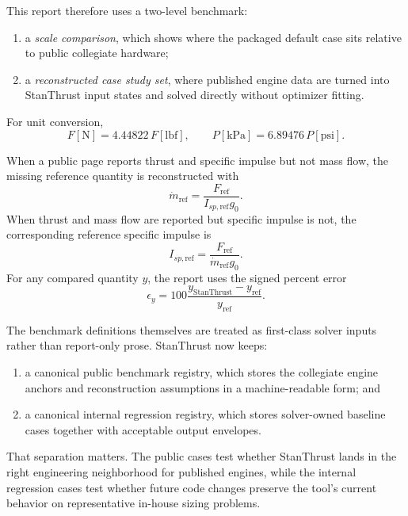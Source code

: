 \documentclass[11pt]{article}
\begin{document}
This report therefore uses a two-level benchmark:
\begin{enumerate}[leftmargin=6mm]
\item a \emph{scale comparison}, which shows where the packaged default case sits relative to public collegiate hardware;
\item a \emph{reconstructed case study set}, where published engine data are turned into StanThrust input states and solved directly without optimizer fitting.
\end{enumerate}

For unit conversion,
\begin{equation}
F[\mathrm{N}] = 4.44822\,F[\mathrm{lbf}],
\qquad
P[\mathrm{kPa}] = 6.89476\,P[\mathrm{psi}].
\label{eq:unit-conv}
\end{equation}

When a public page reports thrust and specific impulse but not mass flow, the missing reference quantity is reconstructed with
\begin{equation}
\dot{m}_{\mathrm{ref}} = \frac{F_{\mathrm{ref}}}{I_{sp,\mathrm{ref}} g_0}.
\label{eq:benchmark-mdot}
\end{equation}
When thrust and mass flow are reported but specific impulse is not, the corresponding reference specific impulse is
\begin{equation}
I_{sp,\mathrm{ref}} = \frac{F_{\mathrm{ref}}}{\dot{m}_{\mathrm{ref}} g_0}.
\label{eq:benchmark-isp}
\end{equation}
For any compared quantity $y$, the report uses the signed percent error
\begin{equation}
\epsilon_y = 100\frac{y_{\mathrm{StanThrust}} - y_{\mathrm{ref}}}{y_{\mathrm{ref}}}.
\label{eq:benchmark-error}
\end{equation}

The benchmark definitions themselves are treated as first-class solver inputs rather than report-only prose. StanThrust now keeps:
\begin{enumerate}[leftmargin=6mm]
\item a canonical public benchmark registry, which stores the collegiate engine anchors and reconstruction assumptions in a machine-readable form; and
\item a canonical internal regression registry, which stores solver-owned baseline cases together with acceptable output envelopes.
\end{enumerate}
That separation matters. The public cases test whether StanThrust lands in the right engineering neighborhood for published engines, while the internal regression cases test whether future code changes preserve the tool's current behavior on representative in-house sizing problems.
\end{document}
